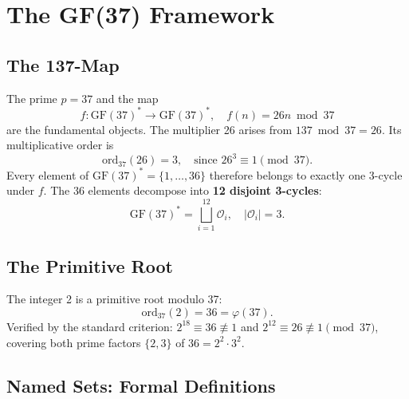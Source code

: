 \documentclass[11pt]{article}
\theoremstyle{remark}
\begin{document}
\section{The GF(37) Framework}
\label{sec:framework}

\subsection{The 137-Map}

The prime $p=37$ and the map
\[
  f\colon \mathrm{GF}(37)^* \to \mathrm{GF}(37)^*,\quad f(n) = 26n \bmod 37
\]
are the fundamental objects. The multiplier 26 arises from $137 \bmod 37 = 26$.
Its multiplicative order is
\[
  \mathrm{ord}_{37}(26) = 3,\quad\text{since } 26^3 \equiv 1 \pmod{37}.
\]
Every element of $\mathrm{GF}(37)^* = \{1,\ldots,36\}$ therefore belongs to exactly
one 3-cycle under $f$. The 36 elements decompose into
\textbf{12 disjoint 3-cycles}:
\[
  \mathrm{GF}(37)^* = \bigsqcup_{i=1}^{12} \mathcal{O}_i,\quad |\mathcal{O}_i|=3.
\]

\subsection{The Primitive Root}

The integer 2 is a primitive root modulo 37:
\[
  \mathrm{ord}_{37}(2) = 36 = \varphi(37).
\]
Verified by the standard criterion: $2^{18}\equiv 36\not\equiv 1$ and
$2^{12}\equiv 26\not\equiv 1\pmod{37}$, covering both prime factors $\{2,3\}$
of $36 = 2^2\cdot 3^2$.

\subsection{Named Sets: Formal Definitions}
\label{sec:defs}
\end{document}
